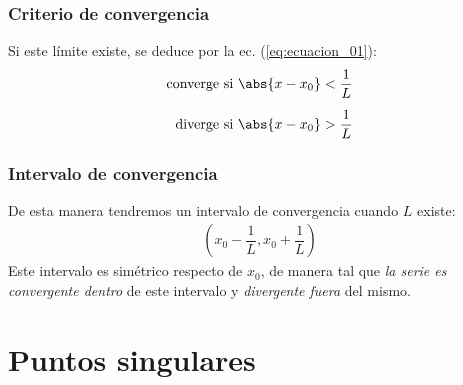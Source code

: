 \begin{frame}
\frametitle{Criterio de convergencia}
Si este límite existe, se deduce por la ec. (\ref{eq:ecuacion_01}):
\begin{align}
\begin{aligned}        
\mbox{converge si } &\abs{x - x_{0}} < \dfrac{1}{L} \\[0.5em]
\mbox{diverge si } &\abs{x - x_{0}} > \dfrac{1}{L}
\end{aligned}
\label{eq:ecuacion_02}    
\end{align}
\end{frame}
\begin{frame}
\frametitle{Intervalo de convergencia}
De esta manera tendremos un intervalo de convergencia cuando $L$ existe:
\begin{align*}
\left( x_{0} - \dfrac{1}{L}, x_{0} + \dfrac{1}{L} \right)
\end{align*}
\pause
Este intervalo es simétrico respecto de $x_{0}$, de manera tal que \emph{la serie es convergente dentro} de este intervalo y \emph{divergente fuera} del mismo.
\end{frame}
\section{Puntos singulares}
